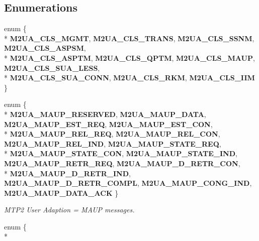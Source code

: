 \subsection*{Enumerations}
\begin{DoxyCompactItemize}
\item 
enum \{ \\*
{\bf M2\+U\+A\+\_\+\+C\+L\+S\+\_\+\+M\+G\+MT}, 
{\bf M2\+U\+A\+\_\+\+C\+L\+S\+\_\+\+T\+R\+A\+NS}, 
{\bf M2\+U\+A\+\_\+\+C\+L\+S\+\_\+\+S\+S\+NM}, 
{\bf M2\+U\+A\+\_\+\+C\+L\+S\+\_\+\+A\+S\+P\+SM}, 
\\*
{\bf M2\+U\+A\+\_\+\+C\+L\+S\+\_\+\+A\+S\+P\+TM}, 
{\bf M2\+U\+A\+\_\+\+C\+L\+S\+\_\+\+Q\+P\+TM}, 
{\bf M2\+U\+A\+\_\+\+C\+L\+S\+\_\+\+M\+A\+UP}, 
{\bf M2\+U\+A\+\_\+\+C\+L\+S\+\_\+\+S\+U\+A\+\_\+\+L\+E\+SS}, 
\\*
{\bf M2\+U\+A\+\_\+\+C\+L\+S\+\_\+\+S\+U\+A\+\_\+\+C\+O\+NN}, 
{\bf M2\+U\+A\+\_\+\+C\+L\+S\+\_\+\+R\+KM}, 
{\bf M2\+U\+A\+\_\+\+C\+L\+S\+\_\+\+I\+IM}
 \}
\item 
enum \{ \\*
{\bf M2\+U\+A\+\_\+\+M\+A\+U\+P\+\_\+\+R\+E\+S\+E\+R\+V\+ED}, 
{\bf M2\+U\+A\+\_\+\+M\+A\+U\+P\+\_\+\+D\+A\+TA}, 
{\bf M2\+U\+A\+\_\+\+M\+A\+U\+P\+\_\+\+E\+S\+T\+\_\+\+R\+EQ}, 
{\bf M2\+U\+A\+\_\+\+M\+A\+U\+P\+\_\+\+E\+S\+T\+\_\+\+C\+ON}, 
\\*
{\bf M2\+U\+A\+\_\+\+M\+A\+U\+P\+\_\+\+R\+E\+L\+\_\+\+R\+EQ}, 
{\bf M2\+U\+A\+\_\+\+M\+A\+U\+P\+\_\+\+R\+E\+L\+\_\+\+C\+ON}, 
{\bf M2\+U\+A\+\_\+\+M\+A\+U\+P\+\_\+\+R\+E\+L\+\_\+\+I\+ND}, 
{\bf M2\+U\+A\+\_\+\+M\+A\+U\+P\+\_\+\+S\+T\+A\+T\+E\+\_\+\+R\+EQ}, 
\\*
{\bf M2\+U\+A\+\_\+\+M\+A\+U\+P\+\_\+\+S\+T\+A\+T\+E\+\_\+\+C\+ON}, 
{\bf M2\+U\+A\+\_\+\+M\+A\+U\+P\+\_\+\+S\+T\+A\+T\+E\+\_\+\+I\+ND}, 
{\bf M2\+U\+A\+\_\+\+M\+A\+U\+P\+\_\+\+R\+E\+T\+R\+\_\+\+R\+EQ}, 
{\bf M2\+U\+A\+\_\+\+M\+A\+U\+P\+\_\+\+D\+\_\+\+R\+E\+T\+R\+\_\+\+C\+ON}, 
\\*
{\bf M2\+U\+A\+\_\+\+M\+A\+U\+P\+\_\+\+D\+\_\+\+R\+E\+T\+R\+\_\+\+I\+ND}, 
{\bf M2\+U\+A\+\_\+\+M\+A\+U\+P\+\_\+\+D\+\_\+\+R\+E\+T\+R\+\_\+\+C\+O\+M\+PL}, 
{\bf M2\+U\+A\+\_\+\+M\+A\+U\+P\+\_\+\+C\+O\+N\+G\+\_\+\+I\+ND}, 
{\bf M2\+U\+A\+\_\+\+M\+A\+U\+P\+\_\+\+D\+A\+T\+A\+\_\+\+A\+CK}
 \}\begin{DoxyCompactList}\small\item\em M\+T\+P2 User Adaption = M\+A\+UP messages. \end{DoxyCompactList}
\item 
enum \{ \\*

\end{DoxyCompactItemize}
